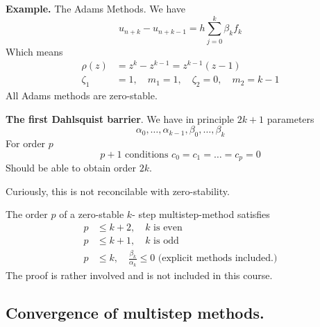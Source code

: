 \documentclass{article}
\theoremstyle{remark}
\newcommand{\newpara}
  {
  \vskip 0.4cm
  }
\begin{document}
\begin{tcolorbox}
  \textbf{Example.} The Adams Methods. We have \[
  u_{n+k} - u_{n+k-1} = h \sum_{j= 0}^{k}  \beta _{k} f_{k}
  \]  
  Which means \[
    \begin{split}
  \rho \left( z \right)  & = z^{k} - z^{k-1} = z^{k-1} \left( z-1 \right) \\
      \zeta _{1 }  & = 1, \quad   m_{1} = 1  ,    \quad  \zeta _{2} = 0  , \quad   m_{2} = k-1
    \end{split} 
  \] 
  All Adams methods are zero-stable. 

  \textbf{The first Dahlsquist barrier}. We have in principle $2k + 1$ parameters \[
  \alpha _{0},  \ldots , \alpha _{k-1}, \beta _{0} , \ldots, \beta _{k}
  \]  
  For order $p$ \[
  p+1 \text{ conditions } c_{0} = c_{1} = \ldots = c_{p} = 0 
  \] 
  Should be able to obtain order $2k$.
  
  \newpara
  Curiously, this is not reconcilable with zero-stability.
  \begin{theorem}
    The order $p$ of a zero-stable $k$- step multistep-method satisfies \[
      \begin{split}
    p  & \le k +2 , \quad  k\text{ is even} \\
    p  &  \le k+1 , \quad  k \text{ is odd}  \\
    p  & \le k, \quad   \frac{\beta _{k}}{\alpha _{k}}  \le 0  \text{ (explicit methods included.)}
      \end{split} 
    \] 
    The proof is rather involved and is not included in this course.  
    
  \end{theorem}

\end{tcolorbox}

\subsection{Convergence of multistep methods.}%
\label{sub:convergence2}
\end{document}
